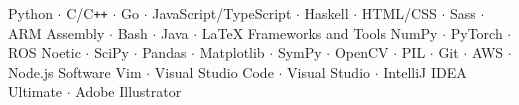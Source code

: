 

\begin{cvskills}
	{Python $\cdot$ C/C\texttt{++} $\cdot$ Go $\cdot$ JavaScript/TypeScript $\cdot$ Haskell $\cdot$ HTML/CSS $\cdot$ Sass $\cdot$ ARM Assembly $\cdot$ Bash $\cdot$ Java $\cdot$ \LaTeX}
	\cvskill
	{Frameworks and Tools}
	{NumPy $\cdot$ PyTorch $\cdot$ ROS Noetic $\cdot$ SciPy $\cdot$ Pandas $\cdot$ Matplotlib $\cdot$ SymPy $\cdot$ OpenCV $\cdot$ PIL $\cdot$ Git $\cdot$ AWS $\cdot$ Node.js}
	\cvskill
	{Software}
	{Vim $\cdot$ Visual Studio Code $\cdot$ Visual Studio $\cdot$ IntelliJ IDEA Ultimate $\cdot$ Adobe Illustrator} 
\end{cvskills}